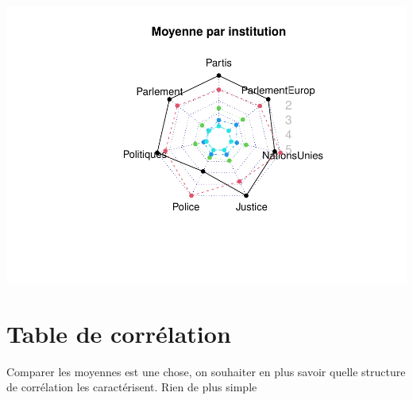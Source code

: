 \documentclass[
]{book}
\newenvironment{Shaded}{\begin{snugshade}}{\end{snugshade}}
\newcommand{\DataTypeTok}[1]{\textcolor[rgb]{0.13,0.29,0.53}{#1}}
\newcommand{\DecValTok}[1]{\textcolor[rgb]{0.00,0.00,0.81}{#1}}
\newcommand{\KeywordTok}[1]{\textcolor[rgb]{0.13,0.29,0.53}{\textbf{#1}}}
\newcommand{\NormalTok}[1]{#1}
\newcommand{\OperatorTok}[1]{\textcolor[rgb]{0.81,0.36,0.00}{\textbf{#1}}}
\newcommand{\OtherTok}[1]{\textcolor[rgb]{0.56,0.35,0.01}{#1}}
\newcommand{\StringTok}[1]{\textcolor[rgb]{0.31,0.60,0.02}{#1}}
\begin{document}
\includegraphics{bookdown-demo_files/figure-latex/0504-1.pdf}

\hypertarget{table-de-corruxe9lation}{%
\section{Table de corrélation}\label{table-de-corruxe9lation}}

Comparer les moyennes est une chose, on souhaiter en plus savoir quelle structure de corrélation les caractérisent. Rien de plus simple

\begin{Shaded}
\end{Shaded}
\end{document}
